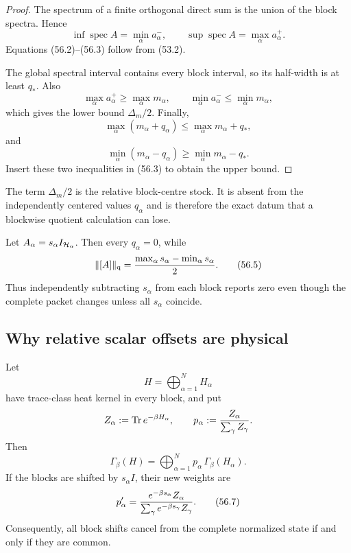 \documentclass[11pt]{article}
\theoremstyle{remark}
\begin{document}
\begin{proof}
The spectrum of a finite orthogonal direct sum is the union of the
block spectra.  Hence
\[
 \inf\operatorname{spec}A=\min_\alpha a_\alpha^-,
 \qquad
 \sup\operatorname{spec}A=\max_\alpha a_\alpha^+.
\]
Equations (56.2)--(56.3) follow from (53.2).

The global spectral interval contains every block interval, so its
half-width is at least \(q_*\).  Also
\[
 \max_\alpha a_\alpha^+\geq\max_\alpha m_\alpha,
 \qquad
 \min_\alpha a_\alpha^-\leq\min_\alpha m_\alpha,
\]
which gives the lower bound \(\Delta_m/2\).  Finally,
\[
 \max_\alpha(m_\alpha+q_\alpha)
 \leq\max_\alpha m_\alpha+q_*,
\]
and
\[
 \min_\alpha(m_\alpha-q_\alpha)
 \geq\min_\alpha m_\alpha-q_*.
\]
Insert these two inequalities in (56.3) to obtain the upper bound.
\end{proof}

The term \(\Delta_m/2\) is the relative block-centre stock.  It is
absent from the independently centered values \(q_\alpha\) and is
therefore the exact datum that a blockwise quotient calculation can
lose.

\begin{example}
\label{ex:v12v56-erasure}
Let \(A_\alpha=s_\alpha I_{{\cal H}_\alpha}\).  Then every
\(q_\alpha=0\), while
\begin{equation}
 \|[A]\|_{\rm q}
 =
 {\max_\alpha s_\alpha-\min_\alpha s_\alpha\over2}.           \tag{56.5}
\end{equation}
Thus independently subtracting \(s_\alpha\) from each block reports
zero even though the complete packet changes unless all
\(s_\alpha\) coincide.
\end{example}

\subsection{Why relative scalar offsets are physical}

Let
\[
 H=\bigoplus_{\alpha=1}^N H_\alpha
\]
have trace-class heat kernel in every block, and put
\[
 Z_\alpha:=\operatorname{Tr}e^{-\beta H_\alpha},
 \qquad
 p_\alpha:={Z_\alpha\over\sum_\gamma Z_\gamma}.
\]
Then
\begin{equation}
 \Gamma_\beta(H)
 =
 \bigoplus_{\alpha=1}^N
 p_\alpha\,\Gamma_\beta(H_\alpha).                \tag{56.6}
\end{equation}
If the blocks are shifted by \(s_\alpha I\), their new weights are
\begin{equation}
 p_\alpha'
 =
 {e^{-\beta s_\alpha}Z_\alpha
  \over\sum_\gamma e^{-\beta s_\gamma}Z_\gamma}.  \tag{56.7}
\end{equation}
Consequently, all block shifts cancel from the complete normalized
state if and only if they are common.
\end{document}
